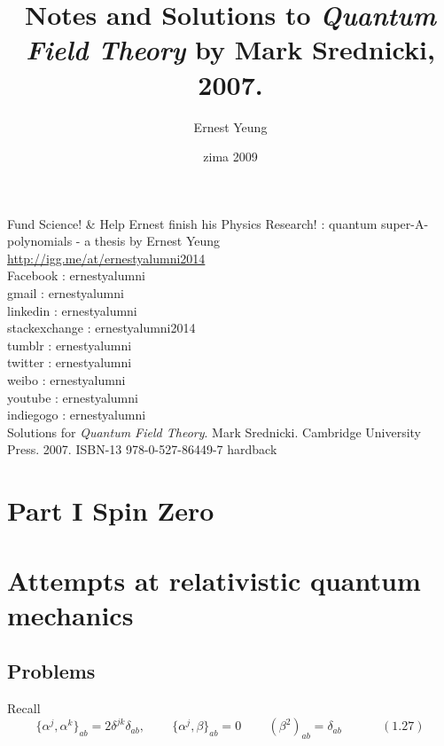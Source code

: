\documentclass[twoside]{amsart}
\title{
Notes and Solutions to \emph{Quantum Field Theory} by Mark Srednicki, 2007.  
}
\author{
  Ernest Yeung
       }
\date{zima 2009}
\newcommand{\solutionhead}[1]
  {\smallskip
   \noindent{\large\bf Solution #1.}
   }
\begin{document}

\maketitle

Fund Science! \& Help Ernest finish his Physics Research! : quantum super-A-polynomials - a thesis by Ernest Yeung \\

\url{http://igg.me/at/ernestyalumni2014} \\

\noindent Facebook  : ernestyalumni \\
gmail         : ernestyalumni \\
linkedin      : ernestyalumni \\
stackexchange : ernestyalumni2014  \\ 
tumblr        : ernestyalumni \\
twitter       : ernestyalumni \\
weibo         : ernestyalumni \\ 
youtube       : ernestyalumni \\
indiegogo     : ernestyalumni \\


Solutions for \emph{Quantum Field Theory}.  Mark Srednicki.  Cambridge University Press.  2007.  ISBN-13 978-0-527-86449-7 hardback

\section*{Part I Spin Zero}

\section{Attempts at relativistic quantum mechanics}

\subsection*{Problems}

\solutionhead{1.1} Recall
\[
\lbrace \alpha^j, \alpha^k \rbrace_{ab} = 2 \delta^{jk} \delta_{ab}, \quad \quad \, \lbrace \alpha^j, \beta \rbrace_{ab} = 0 \quad \quad \,  (\beta^2)_{ab} = \delta_{ab} \quad \quad \quad  \, (1.27) 
\]
\end{document}
